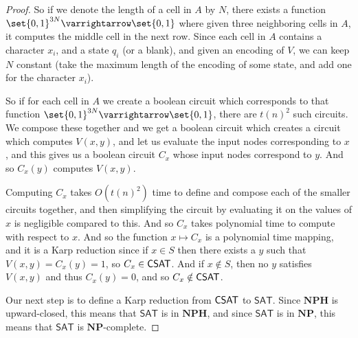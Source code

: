 \documentclass[10pt]{article}
\let\to=\varrightarrow
\def\sat{\textsf{SAT}}
\def\NP{\mathbf{NP}}
\def\NPH{\mathbf{NPH}}
\begin{document}
\begin{proof}
    So if we denote the length of a cell in $A$ by $N$, there exists a function $\set{0,1}^{3N}\to\set{0,1}$ where given three neighboring cells in $A$, it computes the middle cell in the next row.
    Since each cell in $A$ contains a character $x_i$, and a state $q_i$ (or a blank), and given an encoding of $V$, we can keep $N$ constant (take the maximum length of the encoding of some state, and add
    one for the character $x_i$).

    So if for each cell in $A$ we create a boolean circuit which corresponds to that function $\set{0,1}^{3N}\to\set{0,1}$, there are $t(n)^2$ such circuits.
    We compose these together and we get a boolean circuit which creates a circuit which computes $V(x,y)$, and let us evaluate the input nodes corresponding to $x$, and this gives us a boolean circuit
    $C_x$ whose input nodes correspond to $y$.
    And so $C_x(y)$ computes $V(x,y)$.

    Computing $C_x$ takes $O(t(n)^2)$ time to define and compose each of the smaller circuits together, and then simplifying the circuit by evaluating it on the values of $x$ is negligible compared to this.
    And so $C_x$ takes polynomial time to compute with respect to $x$.
    And so the function $x\mapsto C_x$ is a polynomial time mapping, and it is a Karp reduction since if $x\in S$ then there exists a $y$ such that $V(x,y)=C_x(y)=1$, so $C_x\in\mathsf{CSAT}$.
    And if $x\notin S$, then no $y$ satisfies $V(x,y)$ and thus $C_x(y)=0$, and so $C_x\notin\mathsf{CSAT}$.

    Our next step is to define a Karp reduction from $\mathsf{CSAT}$ to $\sat$.
    Since $\NPH$ is upward-closed, this means that $\sat$ is in $\NPH$, and since $\sat$ is in $\NP$, this means that $\sat$ is $\NP$-complete.


\end{proof}
\end{document}
